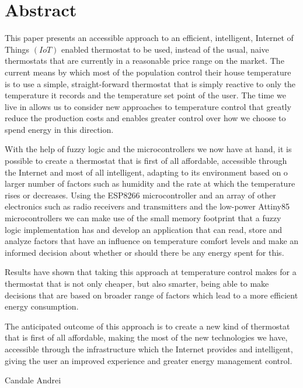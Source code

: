 \chapter*{Abstract}
\thispagestyle{empty}
\addtocounter{page}{-1}

\qquad This paper presents an accessible approach to an efficient, intelligent, Internet of Things $(IoT)$ enabled
thermostat to be used, instead of the usual, naive thermostats that are currently in a reasonable price range
on the market. The current means by which most of the population control their house temperature is to use a
simple, straight-forward thermostat that is simply reactive to only the temperature it records and the
temperature set point of the user. The time we live in allows us to consider new approaches to temperature
control that greatly reduce the production costs and enables greater control over how we choose to spend energy
in this direction.

\qquad With the help of fuzzy logic and the microcontrollers we now have at hand, it is possible
to create a thermostat that is first of all affordable, accessible through the Internet and most of all
intelligent, adapting to its environment based on o larger number of factors such as humidity and the rate at
which the temperature rises or decreases. Using the ESP8266 microcontroller and an array of other electronics
such as radio receivers and transmitters and the low-power Attiny85 microcontrollers we can make use of the
small memory footprint that a fuzzy logic implementation has and develop an application that can read, store
and analyze factors that have an influence on temperature comfort levels and make an informed decision about
whether or should there be any energy spent for this.

\qquad Results have shown that taking this approach at temperature control makes for a thermostat that is not
only cheaper, but also smarter, being able to make decisions that are based on broader range of factors which
lead to a more efficient energy consumption.

\qquad The anticipated outcome of this approach is to create a new kind of
thermostat that is first of all affordable, making the most of the new technologies we have, accessible through
the infrastructure which the Internet provides and intelligent, giving the user an improved experience and
greater energy management control.

\begin{flushright}
Candale Andrei
\end{flushright}

